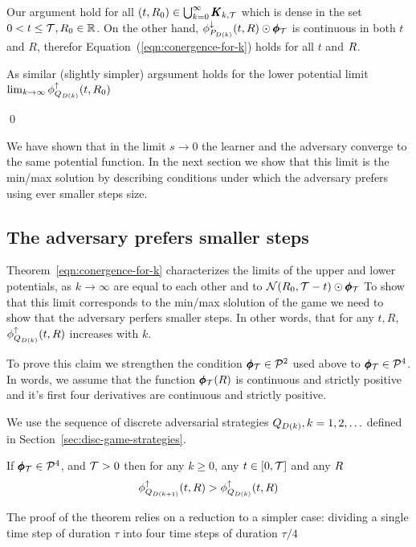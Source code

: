 \documentclass{article}[12pt]
\begin{document}
Our argument hold for all $(t,R_0) \in \bigcup_{k=0}^\infty \pmb{K}_{k,\mathcal{T}}$ which is dense in the set $0<t\leq \mathcal{T}, R_0 \in \mathbb{R}$.
On the other hand, $\phi_{P_{D(k)}}^{\downarrow}(t,R) \odot \pmb{\phi}_{\mathcal{T}}$ is continuous in both
$t$ and $R$, therefor Equation~(\ref{eqn:conergence-for-k})  holds for all $t$ and $R$.

As similar (slightly simpler) argsument holds for the lower potential limit
$\lim_{k \to \infty} \phi_{Q_{D(k)}}^{\uparrow}(t,R_0)$

\qed

We have shown that in the limit $s \to 0$ the learner and the
adversary converge to the same potential function. In the next section
we show that this limit is the min/max solution by describing conditions
under which the adversary prefers using ever smaller steps size.

\subsection{The adversary prefers smaller steps} \label{sec:smallsteps}

Theorem~\ref{eqn:conergence-for-k} characterizes the limits of the
upper and lower potentials, as $k \to \infty$ are equal to each other
and to ${\cal N}(R_0,\mathcal{T}-t) \odot \pmb{\phi}_{\mathcal{T}}$ To show that this
limit corresponds to the min/max slolution of the game we need to show
that the adversary perfers smaller steps. In other words, that
for any $t,R$, $\phi_{Q_{D(k)}}^{\uparrow}(t,R)$ increases with $k$.

To prove this claim we strengthen the condition $\pmb{\phi}_{\mathcal{T}} \in {\cal P}^{2}$ used above to $\pmb{\phi}_{\mathcal{T}} \in {\cal P}^{4}$. In words, we assume that the function $\pmb{\phi}_{\mathcal{T}}(R)$ is continuous and strictly positive and it's first four derivatives are continuous and strictly positive.

We use the sequence of discrete adversarial strategies
$Q_{D(k)}, k=1,2,\ldots$ defined in
Section~\ref{sec:disc-game-strategies}.

\begin{theorem}\label{thm:smallerSteps}
  If $ \pmb{\phi}_{\mathcal{T}} \in {\cal P}^{4}$, and $\mathcal{T}>0$  
  then for any $k\geq 0$, any $t \in [0,\mathcal{T}]$ and any $R$
  $$\phi_{Q_{D(k+1)}}^{\uparrow}(t,R) >  \phi_{Q_{D(k)}}^{\uparrow}(t,R)$$
\end{theorem}

The proof of the theorem relies on a reduction to a simpler case:
dividing a single time step of duration $\tau$ into four time steps of duration  $\tau/4$
\end{document}
